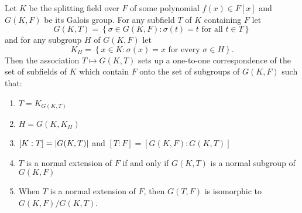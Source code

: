 \begin{theorem}\label{thm:galois-correspondence}
	Let $K$ be the splitting field over $F$ of some polynomial ${f(x)}\in{F[x]}$
	and $G(K,F)$ be its Galois group. For any subfield $T$ of $K$ containing $F$
	let
	\[
		G(K,T)=\left\{{\sigma}\in{G(K,F)}:\sigma(t)=t\text{ for all }{t}\in{T}\right\}
	\]
	and for any subgroup $H$ of $G(K,F)$ let
	\[
		K_{H}=\left\{{x}\in{K}:\sigma(x)=x\text{ for every }{\sigma}\in{H}\right\}.
	\]
	Then the association ${T}\mapsto{G(K,T)}$ sets up a one-to-one correspondence
	of the set of subfields of $K$ which contain $F$ onto the set of subgroups of
	$G(K,F)$ such that:
	\begin{enumerate}
		\item $T=K_{G(K,T)}$
		\item $H=G(K,K_{H})$
		\item $[K:T]=\lvert G(K,T)\rvert$ and $[T:F]=[G(K,F):G(K,T)]$
		\item $T$ is a normal extension of $F$ if and only if $G(K,T)$ is a normal
		      subgroup of $G(K,F)$
		\item When $T$ is a normal extension of $F$, then $G(T,F)$ is isomorphic to
		      $G(K,F)/G(K,T)$.
	\end{enumerate}
\end{theorem}
